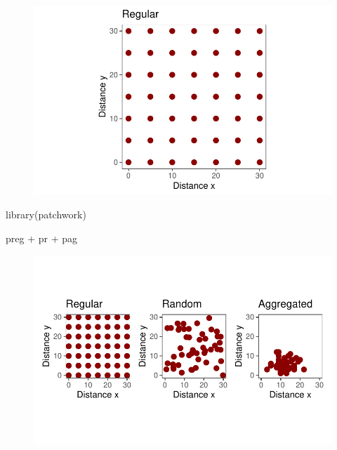 \documentclass[
  letterpaper,
  DIV=11,
  numbers=noendperiod]{scrreprt}
\newenvironment{Shaded}{\begin{snugshade}}{\end{snugshade}}
\newcommand{\FunctionTok}[1]{\textcolor[rgb]{0.28,0.35,0.67}{#1}}
\newcommand{\NormalTok}[1]{\textcolor[rgb]{0.00,0.23,0.31}{#1}}
\newcommand{\SpecialCharTok}[1]{\textcolor[rgb]{0.37,0.37,0.37}{#1}}
\begin{document}
\begin{figure}[H]

{\centering \includegraphics{./spatial-patterns_files/figure-pdf/unnamed-chunk-10-1.pdf}

}

\end{figure}

\begin{Shaded}
\begin{Highlighting}[]
\FunctionTok{library}\NormalTok{(patchwork)}

\NormalTok{preg }\SpecialCharTok{+}\NormalTok{ pr }\SpecialCharTok{+}\NormalTok{ pag}
\end{Highlighting}
\end{Shaded}

\begin{figure}[H]

{\centering \includegraphics{./spatial-patterns_files/figure-pdf/unnamed-chunk-12-1.pdf}

}

\end{figure}
\end{document}
